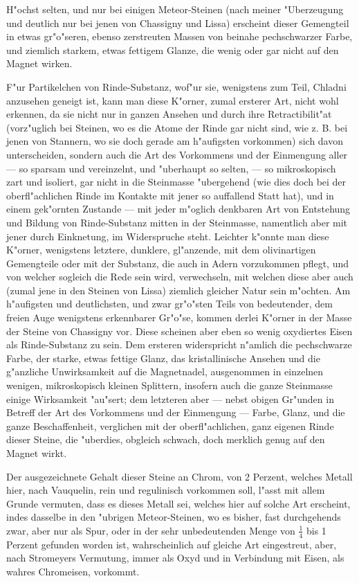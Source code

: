 \documentclass[a4paper, 11pt, oneside, german]{article}
\begin{document}
H"ochst selten, und nur bei einigen Meteor-Steinen (nach meiner "Uberzeugung und deutlich nur bei jenen von Chassigny und Lissa) erscheint dieser Gemengteil in etwas gr"o"seren, ebenso zerstreuten Massen von beinahe pechschwarzer Farbe, und ziemlich starkem, etwas fettigem Glanze, die wenig oder gar nicht auf den Magnet wirken.

F"ur Partikelchen von Rinde-Substanz, wof"ur sie, wenigstens zum Teil, Chladni anzusehen geneigt ist, kann man diese K"orner, zumal ersterer Art, nicht wohl erkennen, da sie nicht nur in ganzen Ansehen und durch ihre Retractibilit"at (vorz"uglich bei Steinen, wo es die Atome der Rinde gar nicht sind, wie z. B. bei jenen von Stannern, wo sie doch gerade am h"aufigsten vorkommen) sich davon unterscheiden, sondern auch die Art des Vorkommens und der Einmengung aller --- so sparsam und vereinzelnt, und "uberhaupt so selten, --- so mikroskopisch zart und isoliert, gar nicht in die Steinmasse "ubergehend (wie dies doch bei der oberfl"achlichen Rinde im Kontakte mit jener so auffallend Statt hat), und in einem gek"ornten Zustande --- mit jeder m"oglich denkbaren Art von Entstehung und Bildung von Rinde-Substanz mitten in der Steinmasse, namentlich aber mit jener durch Einknetung, im Widerspruche steht. Leichter k"onnte man diese K"orner, wenigstens letztere, dunklere, gl"anzende, mit dem olivinartigen Gemengteile oder mit der Substanz, die auch in Adern vorzukommen pflegt, und von welcher sogleich die Rede sein wird, verwechseln, mit welchen diese aber auch (zumal jene in den Steinen von Lissa) ziemlich gleicher Natur sein m"ochten. Am h"aufigsten und deutlichsten, und zwar gr"o"sten Teils von bedeutender, dem freien Auge wenigstens erkennbarer Gr"o"se, kommen derlei K"orner in der Masse der Steine von Chassigny vor. Diese scheinen aber eben so wenig oxydiertes Eisen als Rinde-Substanz zu sein. Dem ersteren widerspricht n"amlich die pechschwarze Farbe, der starke, etwas fettige Glanz, das kristallinische Ansehen und die g"anzliche Unwirksamkeit auf die Magnetnadel, ausgenommen in einzelnen wenigen, mikroskopisch kleinen Splittern, insofern auch die ganze Steinmasse einige Wirksamkeit "au"sert; dem letzteren aber --- nebst obigen Gr"unden in Betreff der Art des Vorkommens und der Einmengung --- Farbe, Glanz, und die ganze Beschaffenheit, verglichen mit der oberfl"achlichen, ganz eigenen Rinde dieser Steine, die "uberdies, obgleich schwach, doch merklich genug auf den Magnet wirkt.

Der ausgezeichnete Gehalt dieser Steine an Chrom, von 2 Perzent, welches Metall hier, nach Vauquelin, rein und regulinisch vorkommen soll, l"asst mit allem Grunde vermuten, dass es dieses Metall sei, welches hier auf solche Art erscheint, indes dasselbe in den "ubrigen Meteor-Steinen, wo es bisher, fast durchgehends zwar, aber nur als Spur, oder in der sehr unbedeutenden Menge von $\frac{1}{4}$ bis 1 Perzent gefunden worden ist, wahrscheinlich auf gleiche Art eingestreut, aber, nach Stromeyers Vermutung, immer als Oxyd und in Verbindung mit Eisen, als wahres Chromeisen, vorkommt.
\end{document}
